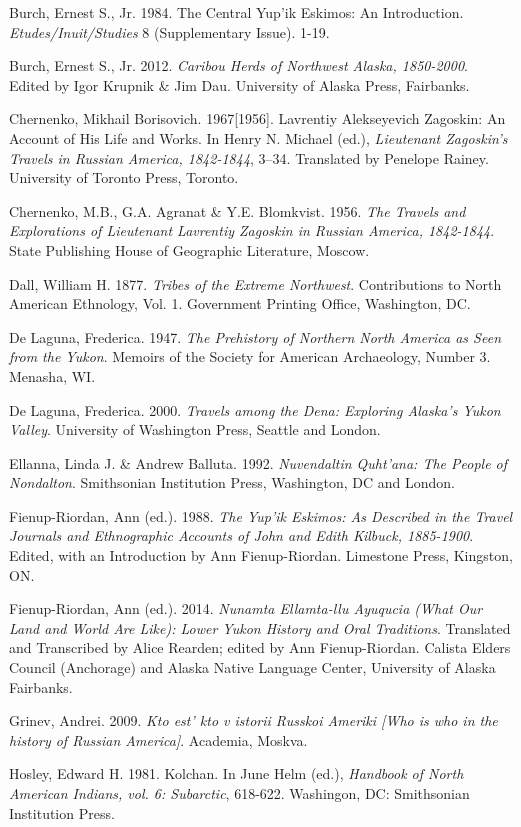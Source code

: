 \begin{hang}
Burch, Ernest S., Jr. 1984. The Central Yup’ik Eskimos: An Introduction. \textit{Etudes/Inuit/Studies} 8 (Supplementary Issue). 1-19.

Burch, Ernest S., Jr. 2012. \textit{Caribou Herds of Northwest Alaska, 1850-2000}. Edited by Igor Krupnik \& Jim Dau. University of Alaska Press, Fairbanks.

Chernenko, Mikhail Borisovich. 1967[1956]. Lavrentiy Alekseyevich Zagoskin: An Account of His Life and Works.  In Henry N. Michael (ed.), \textit{Lieutenant Zagoskin’s Travels in Russian America, 1842-1844}, 3--34. Translated by Penelope Rainey.  University of Toronto Press, Toronto.

Chernenko, M.B., G.A. Agranat \& Y.E. Blomkvist. 1956. \textit{The Travels and Explorations of Lieutenant Lavrentiy Zagoskin in Russian America, 1842-1844}. State Publishing House of Geographic Literature, Moscow.

Dall, William H. 1877. \textit{Tribes of the Extreme Northwest}. Contributions to North American Ethnology, Vol. 1. Government Printing Office, Washington, DC.

De Laguna, Frederica. 1947. \textit{The Prehistory of Northern North America as Seen from the Yukon}. Memoirs of the Society for American Archaeology, Number 3. Menasha, WI.

De Laguna, Frederica. 2000. \textit{Travels among the Dena: Exploring Alaska’s Yukon Valley}. University of Washington Press, Seattle and London.

Ellanna, Linda J. \& Andrew Balluta. 1992. \textit{Nuvendaltin Quht’ana: The People of Nondalton}. Smithsonian Institution Press, Washington, DC and London.

Fienup-Riordan, Ann (ed.). 1988. \textit{The Yup’ik Eskimos: As Described in the Travel Journals and Ethnographic Accounts of John and Edith Kilbuck, 1885-1900}. Edited, with an Introduction by Ann Fienup-Riordan. Limestone Press, Kingston, ON.

Fienup-Riordan, Ann (ed.). 2014. \textit{Nunamta Ellamta-llu Ayuqucia (What Our Land and World Are Like): Lower Yukon History and Oral Traditions}. Translated and Transcribed by Alice Rearden; edited by Ann Fienup-Riordan. Calista Elders Council (Anchorage) and Alaska Native Language Center, University of Alaska Fairbanks.

Grinev, Andrei. 2009. \textit{Kto est’ kto v istorii Russkoi Ameriki [Who is who in the history of Russian America]}. Academia, Moskva.

Hosley, Edward H. 1981. Kolchan. In June Helm (ed.), \textit{Handbook of North American Indians, vol. 6: Subarctic}, 618-622. Washingon, DC: Smithsonian Institution Press.


\end{hang}
